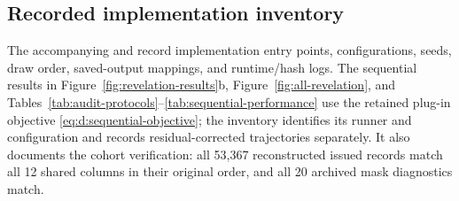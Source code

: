 \FloatBarrier
\begin{samepage}
\subsection{Recorded implementation inventory}
\label{app:implementation-inventory}

The accompanying  and
 record implementation entry points,
configurations, seeds, draw order, saved-output mappings, and runtime/hash logs. The
sequential results in Figure~\ref{fig:revelation-results}b, Figure~\ref{fig:all-revelation},
and Tables~\ref{tab:audit-protocols}--\ref{tab:sequential-performance} use the retained
plug-in objective \eqref{eq:d:sequential-objective}; the inventory identifies its runner and
configuration and records residual-corrected trajectories separately. It also documents the
cohort verification: all 53,367 reconstructed issued records match all 12 shared columns in
their original order, and all 20 archived mask diagnostics match.

\par\end{samepage}

\FloatBarrier
